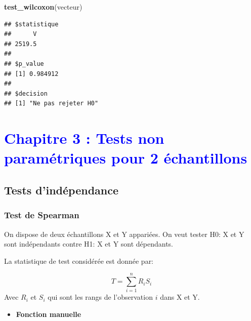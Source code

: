 \documentclass[
  12pt,
]{article}
\newenvironment{Shaded}{\begin{snugshade}}{\end{snugshade}}
\newcommand{\FunctionTok}[1]{\textcolor[rgb]{0.13,0.29,0.53}{\textbf{#1}}}
\newcommand{\NormalTok}[1]{#1}
\providecommand{\tightlist}{%
  \setlength{\itemsep}{0pt}\setlength{\parskip}{0pt}}
\begin{document}
\begin{Shaded}
\begin{Highlighting}[]
\FunctionTok{test\_wilcoxon}\NormalTok{(vecteur)}
\end{Highlighting}
\end{Shaded}

\begin{verbatim}
## $statistique
##      V 
## 2519.5 
## 
## $p_value
## [1] 0.984912
## 
## $decision
## [1] "Ne pas rejeter H0"
\end{verbatim}

\newpage

\section{\texorpdfstring{\textcolor{blue}{Chapitre 3 : Tests non paramétriques pour 2 échantillons}}{}}\label{section-2}

\subsection{Tests d'indépendance}\label{tests-dinduxe9pendance}

\subsubsection{Test de Spearman}\label{test-de-spearman}

On dispose de deux échantillons X et Y appariées. On veut tester H0: X
et Y sont indépendants contre H1: X et Y sont dépendants.

La statistique de test considérée est donnée par:

\[ T= \sum_{i=1}^n R_iS_i  \] Avec \(R_i\) et \(S_i\) qui sont les rangs
de l'observation \(i\) dans X et Y.

\begin{itemize}
\tightlist
\item
  \textbf{Fonction manuelle}
\end{itemize}
\end{document}
